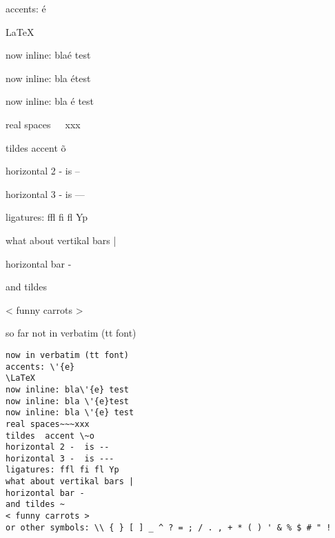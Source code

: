 



accents: \'{e}

\LaTeX

now inline: bla\'{e} test

now inline: bla \'{e}test

now inline: bla \'{e} test

real spaces~~~xxx

tildes  accent \~o

horizontal 2 -  is -- 

horizontal 3 -  is --- 

ligatures: ffl fi fl Yp

what about vertikal bars |

horizontal bar -

and tildes ~

< funny carrots >


so far  not in verbatim (tt font)

\begin{verbatim}
now in verbatim (tt font)
accents: \'{e}
\LaTeX
now inline: bla\'{e} test
now inline: bla \'{e}test
now inline: bla \'{e} test
real spaces~~~xxx
tildes  accent \~o
horizontal 2 -  is -- 
horizontal 3 -  is --- 
ligatures: ffl fi fl Yp
what about vertikal bars |
horizontal bar -
and tildes ~
< funny carrots >
or other symbols: \\ { } [ ] _ ^ ? = ; / . , + * ( ) ' & % $ # " !
\end{verbatim}


